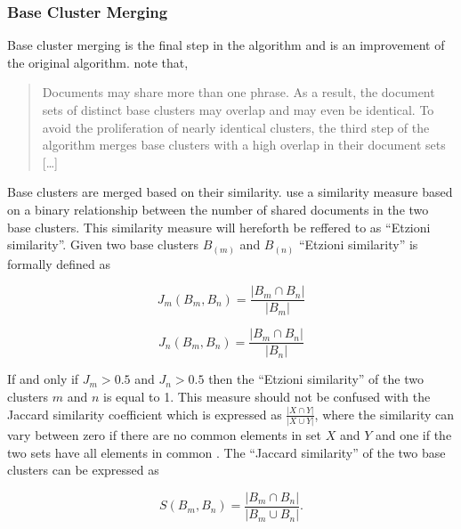 \subsubsection{Base Cluster Merging}
Base cluster merging is the final step in the \STC algorithm and is an improvement of the original algorithm. \citeauthor{Oren1998} note that,
\begin{quote}
Documents may share more than one phrase. As a result, the document sets of distinct base clusters may overlap and may even be identical. To avoid the proliferation of nearly identical clusters, the third step of the algorithm merges base clusters with a high overlap in their document sets [\dots] \cite[][3]{Oren1998}
\end{quote}

Base clusters are merged based on their similarity. \citeauthor{Oren1998} use a similarity measure based on a binary relationship between the number of shared documents in the two base clusters. This similarity measure will hereforth be reffered to as ``Etzioni similarity''. Given two base clusters \(B_(m)\) and \(B_(n)\) ``Etzioni similarity'' is formally defined as 

\begin{displaymath} 
J_{m}(B_{m},B_{n}) = 
\frac{\vert B_{m} \cap B_{n} \vert} {\vert B_{m} \vert}
\end{displaymath}

\begin{displaymath} 
J_{n}(B_{m},B_{n}) = 
\frac{\vert B_{m} \cap B_{n} \vert} {\vert B_{n} \vert}
\end{displaymath}

If and only if \(J_{m} > 0.5\) and \(J_{n} > 0.5 \) then the ``Etzioni similarity'' of the two clusters \(m\) and \(n\) is equal to 1. This measure should not be confused with the Jaccard similarity coefficient which is expressed as 
\begin{math}
\frac{\vert X \cap Y \vert} {\vert X \cup Y \vert}
\end{math}, where the similarity can vary between zero if there are no common elements in set \(X\) and \(Y\) and one if the two sets have all elements in common \cite{VanRijsbergen1979}. The ``Jaccard similarity'' of the two base clusters can be expressed as

\begin{displaymath} 
S(B_{m}, B_{n}) = 
\frac{\vert B_{m} \cap B_{n} \vert} {\vert B_{m} \cup B_{n} \vert}.
\end{displaymath}


